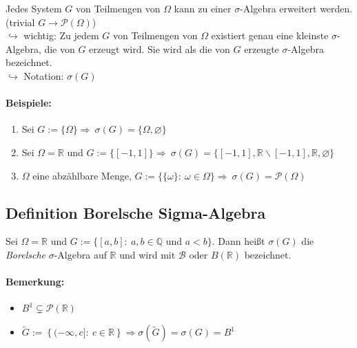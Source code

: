 \documentclass[12pt,a4paper]{article}
\begin{document}
	Jedes System $G$ von Teilmengen von $\Omega$ kann zu einer $\sigma$-Algebra erweitert werden. (trivial $G\rightarrow\mathcal{P}(\Omega)$)\\
	$\hookrightarrow$ wichtig: Zu jedem $G$ von Teilmengen von $\Omega$ existiert genau eine kleinste $\sigma$-Algebra, die von $G$ erzeugt wird.	Sie wird als die von $G$ erzeugte $\sigma$-Algebra bezeichnet. \\
	$\hookrightarrow$ Notation: $\sigma(G)$
	
	\paragraph{Beispiele:}
	\begin{enumerate}
	\label{enum10.1}
		\item Sei $G:=\{\Omega\}\Rightarrow \: \sigma(G)=\{\Omega,\varnothing\}$
		\item Sei $\Omega=\mathbb{R}$ und $G:=\{[-1,1]\}\Rightarrow\: \sigma(G)=\{[-1,1],\mathbb{R}\backslash [-1,1],\mathbb{R},\varnothing\}$
		\item $\Omega$ eine abzählbare Menge, $G:=\{\{\omega\}:\: \omega\in\Omega\}\Rightarrow \: \sigma(G)=\mathcal{P}(\Omega)$
	\end{enumerate}
	
	\subsection{Definition Borelsche Sigma-Algebra}
	\label{defBorelsch}
	Sei $\Omega = \mathbb{R}$ und $\displaystyle G:=\{[a,b]: \: a,b\in\mathbb{Q}$ und $a<b\}$. Dann heißt $\sigma (G)$ die \textit{Borelsche} $\sigma $-Algebra auf $\mathbb{R}$ und wird mit $\mathcal{B}$ oder $B(\mathbb{R})$ bezeichnet.	
	
	\paragraph{Bemerkung:}
	\begin{itemize}
		\item $\displaystyle B^1 \subsetneq \mathcal{P}(\mathbb{R})$
		\item $\displaystyle \tilde{G}:= \left\{(-\infty,c]: \: c\in\mathbb{R}\right\} \Rightarrow \sigma(\tilde{G})=\sigma(G)=B^1$
	\end{itemize}
	
	
\end{document}
